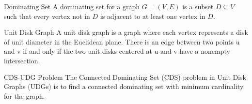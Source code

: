 \begin{block}{Dominating Set}
    A dominating set for a graph \( G = (V, E) \) is a subset \( D \subseteq V \) such that every vertex not in \( D \) is adjacent to at least one vertex in \( D \).
\end{block}
    
\begin{block}{Unit Disk Graph}
    A unit disk graph is a graph where each vertex represents a disk of unit diameter in the Euclidean plane. There is an edge between two points u and v if and only if the two unit disks centered at u and v have a nonempty intersection.
\end{block}
    
\begin{block}{CDS-UDG Problem}
    The Connected Dominating Set (CDS) problem in Unit Disk Graphs (UDGs) is to find a connected dominating set with minimum cardinality for the graph.

\end{block}